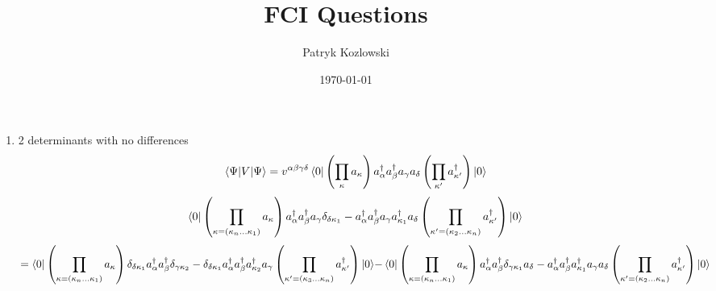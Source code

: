 \documentclass[12pt]{article}
\title{FCI Questions}
\author{Patryk Kozlowski}
\date{\today} %
\begin{document}
    \maketitle
\begin{enumerate}
    \item 2 determinants with no differences
    \begin{subequations}
        \begin{align}
            \mel{\Psi}{V}{\Psi}=v^{\alpha\beta\gamma\delta}\bra{0}\left(\prod_{\kappa}^{}a_{\kappa}\right)a^{\dag}_{\alpha}a^{\dag}_{\beta}a_{\gamma}a_{\delta}
        \left(\prod_{\kappa^{\prime}}^{}a^{\dag}_{\kappa^{\prime}}\right)\ket{0}
        \end{align}
    \end{subequations}
    \begin{subequations}
        \begin{align}
            \bra{0}\left(\prod_{\kappa=\left(\kappa_{n}\dots\kappa_{1}\right)}a_{\kappa}\right)
                a^{\dag}_{\alpha}a^{\dag}_{\beta}a_{\gamma}\delta_{\delta\kappa_{1}}
                -a^{\dag}_{\alpha}a^{\dag}_{\beta}a_{\gamma}a^{\dag}_{\kappa_{1}}a_{\delta}
            \left(\prod_{\kappa^{\prime}=\left(\kappa_{2}\dots\kappa_{n}\right)}a^{\dag}_{\kappa^{\prime}}\right)\ket{0}
        \end{align}
    \end{subequations}
    \begin{subequations}
        \begin{align}
            =\bra{0}\left(\prod_{\kappa=\left(\kappa_{n}\dots\kappa_{1}\right)}a_{\kappa}\right)
            \delta_{\delta\kappa_{1}}a^{\dag}_{\alpha}a^{\dag}_{\beta}\delta_{\gamma\kappa_{2}}
            -\delta_{\delta\kappa_{1}}a^{\dag}_{\alpha}a^{\dag}_{\beta}a^{\dag}_{\kappa_{2}}a_{\gamma}
        \left(\prod_{\kappa^{\prime}=\left(\kappa_{3}\dots\kappa_{n}\right)}a^{\dag}_{\kappa^{\prime}}\right)\ket{0}
        \end{align}
        \begin{align}
            -\bra{0}\left(\prod_{\kappa=\left(\kappa_{n}\dots\kappa_{1}\right)}a_{\kappa}\right)
                a^{\dag}_{\alpha}a^{\dag}_{\beta}\delta_{\gamma\kappa_{1}}a_{\delta}
                -a^{\dag}_{\alpha}a^{\dag}_{\beta}a^{\dag}_{\kappa_{1}}a_{\gamma}a_{\delta}
            \left(\prod_{\kappa^{\prime}=\left(\kappa_{2}\dots\kappa_{n}\right)}a^{\dag}_{\kappa^{\prime}}\right)\ket{0}
        \end{align}

\end{subequations}
\end{enumerate}
\end{document}
